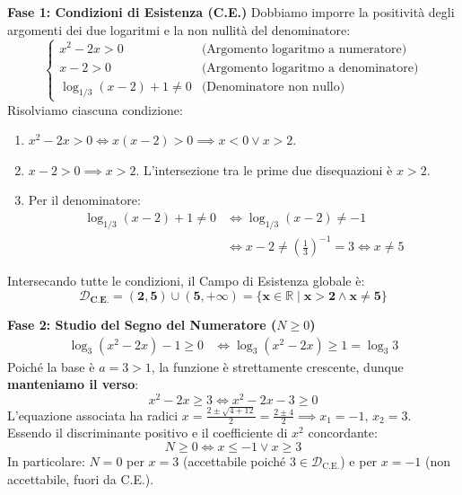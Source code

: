 \documentclass[11pt,a4paper,oneside]{report}
\begin{document}
\begin{dimostrazione}
\textbf{Fase 1: Condizioni di Esistenza (C.E.)}
Dobbiamo imporre la positività degli argomenti dei due logaritmi e la non nullità del denominatore:
\begin{equation}
    \begin{cases}
        x^2 - 2x > 0 & \text{(Argomento logaritmo a numeratore)} \\[1.6ex]
        x - 2 > 0 & \text{(Argomento logaritmo a denominatore)} \\[1.6ex]
        \log_{1/3}(x - 2) + 1 \neq 0 & \text{(Denominatore non nullo)}
    \end{cases}
\end{equation}
Risolviamo ciascuna condizione:
\begin{enumerate}
    \item $x^2 - 2x > 0 \iff x(x - 2) > 0 \implies x < 0 \lor x > 2$.
    \item $x - 2 > 0 \implies x > 2$.
    L'intersezione tra le prime due disequazioni è $x > 2$.
    \item Per il denominatore:
    \begin{align*}
        \log_{1/3}(x - 2) + 1 \neq 0 &\iff \log_{1/3}(x - 2) \neq -1 \\
        &\iff x - 2 \neq \left(\frac{1}{3}\right)^{-1} = 3 \iff x \neq 5
    \end{align*}
\end{enumerate}
Intersecando tutte le condizioni, il Campo di Esistenza globale è:
\begin{equation}
    \mathbf{\mathcal{D}_{\text{C.E.}} = (2, 5) \cup (5, +\infty) = \{x \in \mathbb{R} \mid x > 2 \land x \neq 5\}}
\end{equation}

\vspace{2mm}
\textbf{Fase 2: Studio del Segno del Numeratore ($N \ge 0$)}
\begin{align*}
    \log_3(x^2 - 2x) - 1 \ge 0 &\iff \log_3(x^2 - 2x) \ge 1 = \log_3 3
\end{align*}
Poiché la base è $a = 3 > 1$, la funzione è strettamente crescente, dunque \textbf{manteniamo il verso}:
\begin{equation*}
    x^2 - 2x \ge 3 \iff x^2 - 2x - 3 \ge 0
\end{equation*}
L'equazione associata ha radici $x = \frac{2 \pm \sqrt{4 + 12}}{2} = \frac{2 \pm 4}{2} \implies x_1 = -1, \, x_2 = 3$.
Essendo il discriminante positivo e il coefficiente di $x^2$ concordante:
\begin{equation}
    N \ge 0 \iff x \le -1 \lor x \ge 3
\end{equation}
In particolare: $N = 0$ per $x = 3$ (accettabile poiché $3 \in \mathcal{D}_{\text{C.E.}}$) e per $x = -1$ (non accettabile, fuori da C.E.).


\end{dimostrazione}
\end{document}

